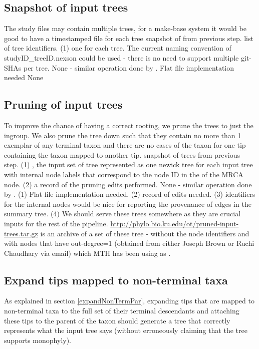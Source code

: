 \documentclass[11pt]{article}
\begin{document}
\subsection{Snapshot of input trees}
\stepExplanation The study files may contain multiple trees, for a make-base system it would
    be good to have a timestamped file for each tree
\stepInput snapshot of \nexson from previous step. list of tree identifiers.
\stepOutput (1) one \nexson for each tree. The current naming convention of studyID\_treeID.nexson could
    be used - there is no need to support multiple git-SHAs per tree.
\currImpl None - similar operation done by \gcmdr.
\implTODO Flat file implementation needed
\currURL None
 
\subsection{Pruning of input trees}
\stepExplanation To improve the chance of having a correct rooting, we prune
    the trees to just the ingroup.
    We also prune the tree down such that they contain no more than 1 exemplar of any
    terminal taxon and there are no cases of the taxon for one tip containing
    the taxon mapped to another tip.
\stepInput snapshot of \nexson trees from previous step.
\stepOutput (1) \phyloInputs, the input set of tree represented as
    one newick tree for each input tree with internal node labels that 
    correspond to the node ID in the \nexson of the MRCA node.
    (2) a record of the pruning edits performed.
\currImpl None - similar operation done by \gcmdr.
\implTODO (1) Flat file implementation needed. 
    (2) record of edits needed. 
    (3) identifiers for the internal nodes would be nice for reporting the provenance of edges in the 
    summary tree. 
    (4) We should serve these trees somewhere as they are crucial inputs for the rest of the pipeline.
\currURL {} \url{http://phylo.bio.ku.edu/ot/pruned-input-trees.tar.gz} is an
    archive of a set of these tree - without the node identifiers and with nodes that have 
    out-degree=1 (obtained from either Joseph Brown or Ruchi Chaudhary via email) which MTH has been
    using as \phyloInputs.

    \subsection{Expand tips mapped to non-terminal taxa}\label{expandedPhyloStep}
\stepExplanation As explained in section \ref{expandNonTermPar}, expanding tips that are mapped
    to non-terminal taxa to the full set of their terminal descendants and attaching these
    tips to the parent of the taxon should generate a tree that correctly represents
    what the input tree says (without erroneously claiming that the tree supports monophyly).
    
\end{document}
